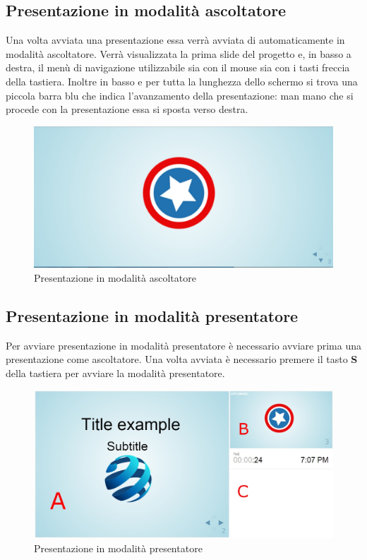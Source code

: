 \subsection{Presentazione in modalità ascoltatore}

\noindent Una volta avviata una presentazione essa verrà avviata di automaticamente in modalità ascoltatore. Verrà visualizzata la prima slide del progetto e, in basso a destra, il menù di navigazione utilizzabile sia con il mouse sia con i tasti freccia della tastiera. Inoltre in basso e per tutta la lunghezza dello schermo si trova una piccola barra blu che indica l'avanzamento della presentazione: man mano che si procede con la presentazione essa si sposta verso destra.
\begin{figure}[H] 
	\centering 
	\includegraphics[scale=0.40] {img/sfondook}
	\caption{Presentazione in modalità ascoltatore} 
\end{figure}


\subsection{Presentazione in modalità presentatore}
\noindent Per avviare presentazione in modalità presentatore è necessario avviare prima una presentazione come ascoltatore. Una volta avviata è necessario premere il tasto \textbf{S} della tastiera per avviare la modalità presentatore.
\begin{figure}[H] 
	\centering 
	\includegraphics[scale=0.40] {img/note}
	\caption{Presentazione in modalità presentatore} 
\end{figure}

